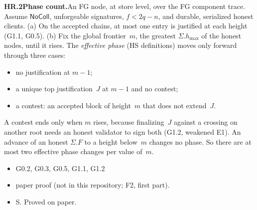 \documentclass{article}
\newcommand{\hmax}{h_{\max}}
\newcommand{\dagnode}[6]{%
\par\medskip\noindent\textbf{#1\enspace #2.}\enspace #3
\begin{itemize}[leftmargin=2.2em,itemsep=0pt,topsep=2pt]
\item[\emph{Uses}] #4
\item[\emph{Evid.}] #5
\item[\emph{Task}] #6
\end{itemize}}
\begin{document}
\dagnode{HR.2}{Phase count}{An FG node, at store level, over the FG
component trace.  Assume $\mathsf{NoColl}$, unforgeable signatures,
$f<2q-n$, and durable, serialized honest clients.
(a) On the accepted chains, at most one entry is justified at each height
(G1.1, G0.5).
(b) Fix the global frontier~$m$, the greatest $\Sigma.\hmax$ of the honest
nodes, until it rises.  The \emph{effective phase} (HS definitions) moves
only forward through three cases:
\begin{itemize}[itemsep=0pt,topsep=2pt]
\item no justification at $m-1$;
\item a unique top justification~$J$ at $m-1$ and no contest;
\item a contest: an accepted block of height~$m$ that does not extend~$J$.
\end{itemize}
A contest ends only when $m$ rises, because finalizing~$J$ against a
crossing on another root needs an honest validator to sign both (G1.2,
weakened E1).  An advance of an honest $\Sigma.F$ to a height below~$m$
changes no phase.  So there are at most two effective phase changes per value
of~$m$.}
{G0.2, G0.3, G0.5, G1.1, G1.2}
{paper proof (not in this repository; F2, first part).}
{S.  Proved on paper.}
\end{document}
